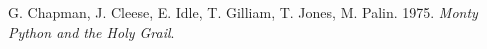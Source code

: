 \documentclass{metanorma}
\begin{document}
\begin{thebibliography}{1}
    G. Chapman, J. Cleese, E. Idle, T. Gilliam, T. Jones, M. Palin. 1975. \textit{Monty Python and the Holy Grail}.
\end{thebibliography}

\end{document}
